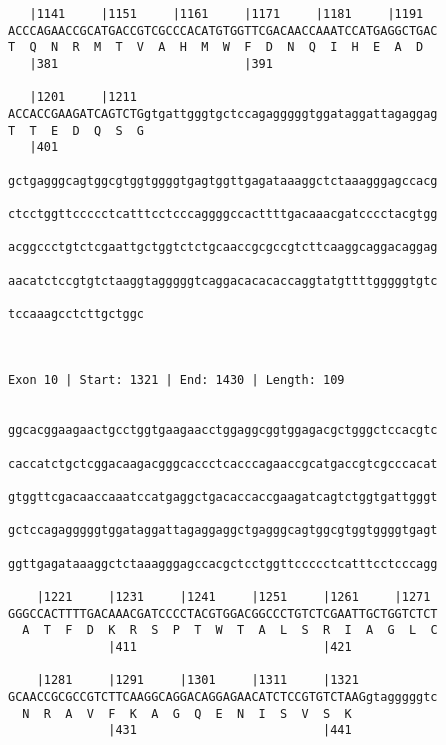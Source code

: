\documentclass{article}
\begin{document}
\begin{Verbatim}
   |1141     |1151     |1161     |1171     |1181     |1191  
ACCCAGAACCGCATGACCGTCGCCCACATGTGGTTCGACAACCAAATCCATGAGGCTGAC
T  Q  N  R  M  T  V  A  H  M  W  F  D  N  Q  I  H  E  A  D  
   |381                          |391                       
  
   |1201     |1211                                          
ACCACCGAAGATCAGTCTGgtgattgggtgctccagagggggtggataggattagaggag
T  T  E  D  Q  S  G                                         
   |401                                                     
  
gctgagggcagtggcgtggtggggtgagtggttgagataaaggctctaaagggagccacg
                                                            
ctcctggttccccctcatttcctcccaggggccacttttgacaaacgatcccctacgtgg
                                                            
acggccctgtctcgaattgctggtctctgcaaccgcgccgtcttcaaggcaggacaggag
                                                            
aacatctccgtgtctaaggtagggggtcaggacacacaccaggtatgttttgggggtgtc
                                                            
tccaaagcctcttgctggc
                   
                   
 
Exon 10 | Start: 1321 | End: 1430 | Length: 109


ggcacggaagaactgcctggtgaagaacctggaggcggtggagacgctgggctccacgtc
                                                            
caccatctgctcggacaagacgggcaccctcacccagaaccgcatgaccgtcgcccacat
                                                            
gtggttcgacaaccaaatccatgaggctgacaccaccgaagatcagtctggtgattgggt
                                                            
gctccagagggggtggataggattagaggaggctgagggcagtggcgtggtggggtgagt
                                                            
ggttgagataaaggctctaaagggagccacgctcctggttccccctcatttcctcccagg
                                                            
    |1221     |1231     |1241     |1251     |1261     |1271 
GGGCCACTTTTGACAAACGATCCCCTACGTGGACGGCCCTGTCTCGAATTGCTGGTCTCT
  A  T  F  D  K  R  S  P  T  W  T  A  L  S  R  I  A  G  L  C
              |411                          |421            
  
    |1281     |1291     |1301     |1311     |1321           
GCAACCGCGCCGTCTTCAAGGCAGGACAGGAGAACATCTCCGTGTCTAAGgtagggggtc
  N  R  A  V  F  K  A  G  Q  E  N  I  S  V  S  K            
              |431                          |441            
  

\end{Verbatim}
\end{document}
